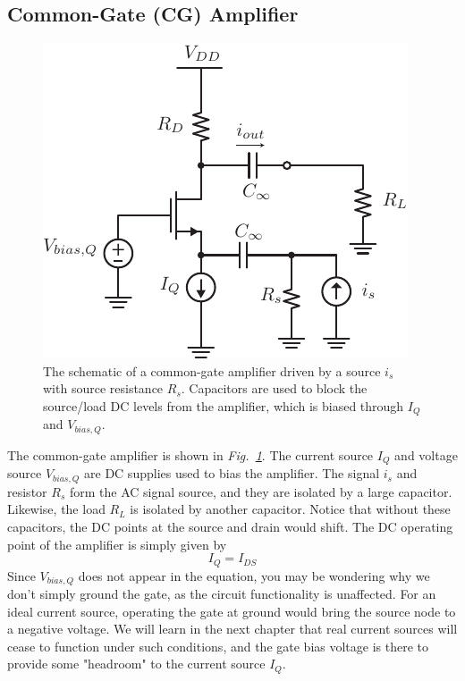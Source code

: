 \subsection{Common-Gate (CG) Amplifier}
\begin{figure}[tb]
\centering
\includegraphics[scale=1]{cgamp_is}
\caption{The schematic of a common-gate amplifier driven by a source $i_s$ with source resistance $R_s$.  Capacitors are used to block the source/load DC levels from the amplifier, which is biased through $I_Q$ and $V_{bias,Q}$.}
\label{fig:cgamp_is}
\end{figure}
The common-gate amplifier is shown in \emph{Fig.~\ref{fig:cgamp_is}}.  The current source $I_Q$ and voltage source $V_{bias,Q}$ are DC supplies used to bias the amplifier.  The signal $i_s$ and resistor $R_s$ form the AC signal source, and they are isolated by a large capacitor.  Likewise, the load $R_L$ is isolated by another capacitor.  Notice that without these capacitors, the DC points at the source and drain would shift.  The DC operating point of the amplifier is simply given by
\begin{equation}
	{I_Q} = {I_{DS}}
\end{equation}
Since $V_{bias,Q}$ does not appear in the equation, you may be wondering why we don't simply ground the gate, as the circuit functionality is unaffected.  For an ideal current source, operating the gate at ground would bring the source node to a negative voltage.  We will learn in the next chapter that real current sources will cease to function under such conditions, and the gate bias voltage is there to provide some "headroom" to the current source $I_Q$.
